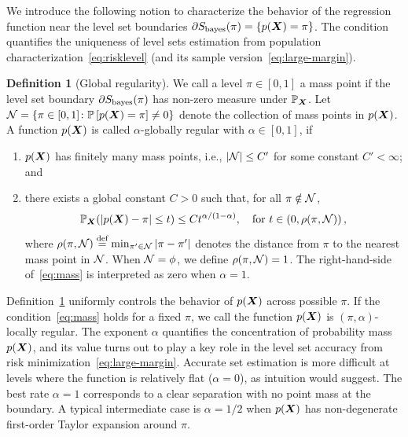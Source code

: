 \documentclass[11pt]{article}
\theoremstyle{definition}
\newtheorem{defn}{Definition}
\def\bayesS{S_{\textup{bayes}}}
\begin{document}
We introduce the following notion to characterize the behavior of the regression function near the level set boundaries $\partial S_{\text{bayes}}(\pi) = \{ p(\bm X)= \pi\}$. The condition quantifies the uniqueness of level sets estimation from population characterization~\eqref{eq:risklevel} (and its sample version~\eqref{eq:large-margin}). 

\begin{defn} [Global regularity]\label{ass:decboundary}We call a level $\pi\in[0,1]$ a mass point if the level set boundary $\partial \bayesS(\pi)$ has non-zero measure under $\mathbb{P}_{\bm X}$. Let $\mathcal{N}=\{\pi\in[0,1] \colon \mathbb{P}\left[p(\bm X)=\pi\right]\neq 0\}$ denote the collection of mass points in $p(\bm X)$. A function $p(\bm X)$ is called $\alpha$-globally regular with $\alpha\in[0,1]$, if 
\begin{enumerate}[label=(\roman*),wide, labelwidth=!, labelindent=0pt,topsep=-5pt,itemsep=-1ex,partopsep=0ex,parsep=1ex]
\item $p(\bm X)$ has finitely many mass points, i.e., $|\mathcal{N}|\leq C'$ for some constant $C'<\infty$; and 
\item 
there exists a global constant $C>0$ such that, for all $\pi \notin \mathcal{N} $,
\begin{equation}\label{eq:mass}
\mathbb{P}_{\bm X}(|p(\bm X)-\pi|\leq t)\leq Ct^{\alpha/(1-\alpha)}, \quad \text{for }t\in \left(0,\rho(\pi,\mathcal{N})\right),
\end{equation}
where $\rho(\pi,\mathcal{N})\stackrel{\text{def}}{=}\min_{\pi'\in \mathcal{N}} |\pi-\pi'|$  denotes the distance from $\pi$ to the nearest mass point in $\mathcal{N}$. When $\mathcal{N} = \phi$, we define $\rho(\pi,\mathcal{N})=1$. The right-hand-side of~\eqref{eq:mass} is interpreted as zero when $\alpha=1$.
\end{enumerate}
\end{defn}

Definition~\ref{ass:decboundary} uniformly controls the behavior of $p(\bm X)$ across possible $\pi$. If the condition~\eqref{eq:mass} holds for a fixed $\pi$, we call the function $p(\bm X)$ is $(\pi,\alpha)$-locally regular. The exponent $\alpha$ quantifies the concentration of probability mass $p(\bm X)$, and its value turns out to play a key role in the level set accuracy from risk minimization~\eqref{eq:large-margin}. Accurate set estimation is more difficult at levels where the function is relatively flat ($\alpha = 0$), as intuition would suggest. The best rate $\alpha=1$ corresponds to a clear separation with no point mass at the boundary. A typical intermediate case is $\alpha=1/2$ when $p(\bm X)$ has non-degenerate first-order Taylor expansion around $\pi$. 
\end{document}
